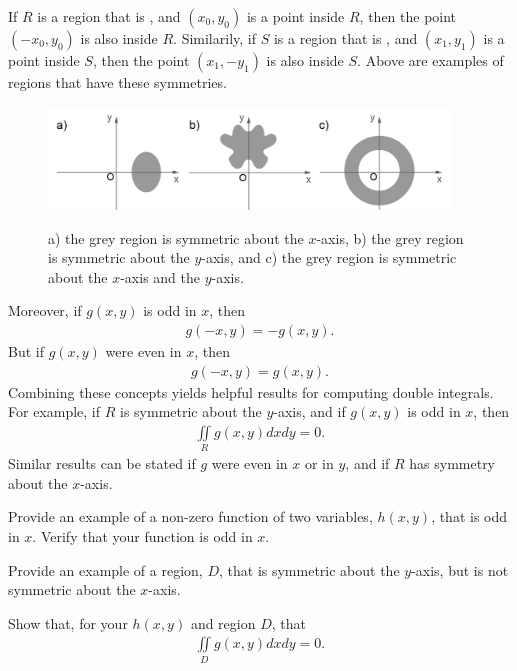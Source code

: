 If $R$ is a region that is , and $(x_0,y_0)$ is a point inside $R$, then the point $(-x_0,y_0)$ is also inside $R$. Similarily, if $S$ is a region that is , and $(x_1,y_1)$ is a point inside $S$, then the point $(x_1,-y_1)$ is also inside $S$. Above are examples of regions that have these symmetries.\\

\begin{figure}[h]
  \vspace{-1pt}
  \begin{center}
    \includegraphics[width=0.95\textwidth]{ImgRegions.jpg}
  \end{center}
 \begin{quote} \caption{\small{a) the grey region is symmetric about the $x$-axis, b) the grey region is symmetric about the $y$-axis, and c) the grey region is symmetric about the $x$-axis and the $y$-axis.}}\end{quote}
\end{figure}

Moreover, if $g(x,y)$ is odd in $x$, then 
\begin{align*}
  g(-x,y) = - g(x,y).
\end{align*}
But if $g(x,y)$ were even in $x$, then 
\begin{align*}
  g(-x,y) =  g(x,y).
\end{align*}
Combining these concepts yields helpful results for computing double integrals. For example, if $R$ is symmetric about the $y$-axis, and if $g(x,y)$ is odd in $x$, then
\begin{align*}
  \iint\limits_R g(x,y) dxdy = 0.
\end{align*}
Similar results can be stated if $g$ were even in $x$ or in $y$, and if $R$ has symmetry about the $x$-axis. 
\BEN
\item Provide an example of a non-zero function of two variables, $h(x,y)$, that is odd in $x$. Verify that your function is odd in $x$.
\item Provide an example of a region, $D$, that is symmetric about the $y$-axis, but is not symmetric about the $x$-axis. 
\item Show that, for your $h(x,y)$ and region $D$, that 
\begin{align*}
  \iint\limits_D g(x,y) dxdy = 0.
\end{align*}
\EEN

\EEN %

